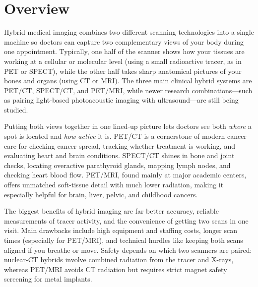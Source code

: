 \label{ch:infographic-hybrid-imaging}

\section{Overview}

Hybrid medical imaging combines two different scanning technologies into a single machine so doctors can capture two complementary views of your body during one appointment. Typically, one half of the scanner shows how your tissues are working at a cellular or molecular level (using a small radioactive tracer, as in PET or SPECT), while the other half takes sharp anatomical pictures of your bones and organs (using CT or MRI). The three main clinical hybrid systems are PET/CT, SPECT/CT, and PET/MRI, while newer research combinations---such as pairing light-based photoacoustic imaging with ultrasound---are still being studied.

Putting both views together in one lined-up picture lets doctors see both \emph{where} a spot is located and \emph{how active} it is. PET/CT is a cornerstone of modern cancer care for checking cancer spread, tracking whether treatment is working, and evaluating heart and brain conditions. SPECT/CT shines in bone and joint checks, locating overactive parathyroid glands, mapping lymph nodes, and checking heart blood flow. PET/MRI, found mainly at major academic centers, offers unmatched soft-tissue detail with much lower radiation, making it especially helpful for brain, liver, pelvic, and childhood cancers.

The biggest benefits of hybrid imaging are far better accuracy, reliable measurements of tracer activity, and the convenience of getting two scans in one visit. Main drawbacks include high equipment and staffing costs, longer scan times (especially for PET/MRI), and technical hurdles like keeping both scans aligned if you breathe or move. Safety depends on which two scanners are paired: nuclear-CT hybrids involve combined radiation from the tracer and X-rays, whereas PET/MRI avoids CT radiation but requires strict magnet safety screening for metal implants.


